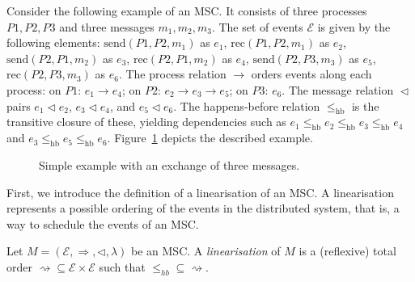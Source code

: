 \bigskip

\begin{example}\label{exmp:msc}
Consider the following example of an MSC.  
It consists of three processes $P1,P2,P3$ and three messages $m_1,m_2,m_3$.  
The set of events $\mathcal{E}$ is given by the following elements:  
$\mathrm{send}(P1,P2,m_1)$ as $e_1$,  
$\mathrm{rec}(P1,P2,m_1)$ as $e_2$,  
$\mathrm{send}(P2,P1,m_2)$ as $e_3$,  
$\mathrm{rec}(P2,P1,m_2)$ as $e_4$,  
$\mathrm{send}(P2,P3,m_3)$ as $e_5$,  
$\mathrm{rec}(P2,P3,m_3)$ as $e_6$.  
The process relation $\rightarrow$ orders events along each process:  
on $P1$: $e_1 \rightarrow e_4$;  
on $P2$: $e_2 \rightarrow e_3 \rightarrow e_5$;  
on $P3$: $e_6$.  
The message relation $\vartriangleleft$ pairs $e_1 \vartriangleleft e_2$,  
$e_3 \vartriangleleft e_4$, and $e_5 \vartriangleleft e_6$.  
The happens-before relation $\le_{\mathrm{hb}}$ is the transitive closure  
of these, yielding dependencies such as  
$e_1 \le_{\mathrm{hb}} e_2 \le_{\mathrm{hb}} e_3 \le_{\mathrm{hb}} e_4$  
and $e_3 \le_{\mathrm{hb}} e_5 \le_{\mathrm{hb}} e_6$.  
Figure~\ref{fig:msc-exmp} depicts the described example.
	
\begin{figure}[!ht]
\centering
\begin{msc}[draw frame=none, draw head=none, msc keyword=, head height=0px, label distance=0.5ex, foot height=0px, foot distance=0px]{}

	\nextlevel
	\nextlevel
\end{msc}
\caption{Simple example with an exchange of three messages.}
\label{fig:msc-exmp}
\end{figure}
\end{example}

First, we introduce the definition of a linearisation of an MSC. A
linearisation represents a possible ordering of the events in the distributed
system, that is, a way to schedule the events of an MSC.

\bigskip

\begin{definition}
	Let $M = (\mathcal{E}, \Rightarrow, \triangleleft, \lambda)$ be an MSC.
	A \emph{linearisation} of $M$ is a (reflexive) total order
	$\rightsquigarrow \subseteq \mathcal{E} \times \mathcal{E}$ such that
	$\leq_{hb} \subseteq \rightsquigarrow$. 
\end{definition}

